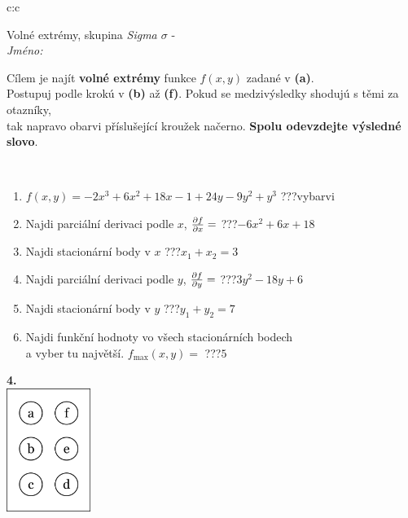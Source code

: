 \documentclass[10pt]{report}
\begin{document}
\begin{tabular}{c:c}
\begin{minipage}[c][104.5mm][t]{0.5\linewidth}
\begin{center}
\vspace{7mm}
{\huge Volné extrémy, skupina \textit{Sigma $\sigma$} -}\\[5mm]
\textit{Jméno:}\phantom{xxxxxxxxxxxxxxxxxxxxxxxxxxxxxxxxxxxxxxxxxxxxxxxxxxxxxxxxxxxxxxxxx}\\[5mm]
\begin{minipage}{0.95\linewidth}
\begin{center}
Cílem je najít \textbf{volné extrémy} funkce $f(x,y)$ zadané v \textbf{(a)}.\\Postupuj podle krokú v \textbf{(b)} až \textbf{(f)}. Pokud se medzivýsledky shodujú s těmi za otazníky,\\tak napravo obarvi příslušející kroužek načerno. \textbf{Spolu odevzdejte výsledné slovo}.
\end{center}
\end{minipage}
\\[1mm]
\begin{minipage}{0.79\linewidth}
\begin{center}
\begin{varwidth}{\linewidth}
\begin{enumerate}
\normalsize
\item $f(x,y)=-2x^3+6x^2+18x-1+24y-9y^2+y^3$\quad \dotfill\; ???\;\dotfill \quad vybarvi
\item Najdi parciální derivaci podle $x$, $\pdv{f}{x}=$\quad \dotfill\; ???\;\dotfill \quad $-6x^2+6x+18$
\item Najdi stacionární body v $x$\quad \dotfill\; ???\;\dotfill \quad $x_1+x_2=3$
\item Najdi parciální derivaci podle $y$, $\pdv{f}{y}=$\quad \dotfill\; ???\;\dotfill \quad $3y^2-18y+6$
\item Najdi stacionární body v $y$\quad \dotfill\; ???\;\dotfill \quad $y_1+y_2=7$
\item Najdi funkční hodnoty vo všech stacionárních bodech \\ \phantom{xxxxxx} a vyber tu najvětší. $f_{\text{max}}(x,y)=$\quad \dotfill\; ???\;\dotfill \quad $5$
\end{enumerate}
\end{varwidth}
\end{center}
\end{minipage}
\begin{minipage}{0.20\linewidth}
\begin{center}
{\Huge\bfseries 4.} \\[2mm]
\includegraphics[height=40mm]{../images/braille.png}

\end{center}
\end{minipage}
\end{center}
\end{minipage}
\end{tabular}
\end{document}
